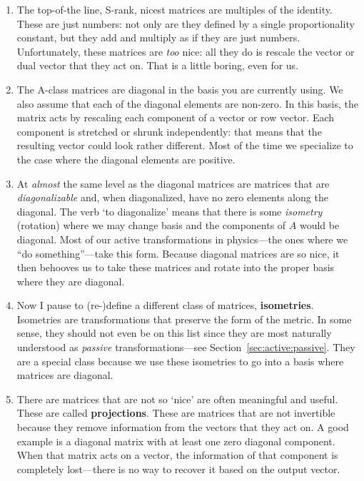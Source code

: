 \documentclass[12pt, oneside]{report}    %
\begin{document}
\begin{enumerate}
    \item The top-of-the line, S-rank, nicest matrices are multiples of the identity. These are just numbers: not only are they defined by a single proportionality constant, but they add and multiply as if they are just numbers. Unfortunately, these matrices are \emph{too} nice: all they do is rescale the vector or dual vector that they act on. That is a little boring, even for us.
    \item The A-class matrices are diagonal in the basis you are currently using. We also assume that each of the diagonal elements are non-zero. In this basis, the matrix acts by rescaling each component of a vector or row vector. Each component is stretched or shrunk independently: that means that the resulting vector could look rather different. Most of the time we specialize to the case where the diagonal elements are positive.
    \item At \emph{almost} the same level as the diagonal matrices are matrices that are \emph{diagonalizable} and, when diagonalized, have no zero elements along the diagonal. The verb `to diagonalize' means that there is some \emph{isometry} (rotation) where we may change basis and the components of $A$ would be diagonal. Most of our active transformations in physics---the ones where we ``do something''---take this form. Because diagonal matrices are so nice, it then behooves us to take these matrices and rotate into the proper basis where they are diagonal.
    \item Now I pause to (re-)define a different class of matrices, \textbf{isometries}. Isometries are transformations that preserve the form of the metric. In some sense, they should not even be on this list since they are most naturally understood as \emph{passive} transformations---see Section~\ref{sec:active:passive}. They are a special class because we use these isometries to go into a basis where matrices are diagonal.
    \item There are matrices that are not so `nice' are often meaningful and useful. These are called \textbf{projections}. These are matrices that are not invertible because they remove information from the vectors that they act on. A good example is a diagonal matrix with at least one zero diagonal component. When that matrix acts on a vector, the information of that component is completely lost---there is no way to recover it based on the output vector. 

\end{enumerate}
\end{document}
